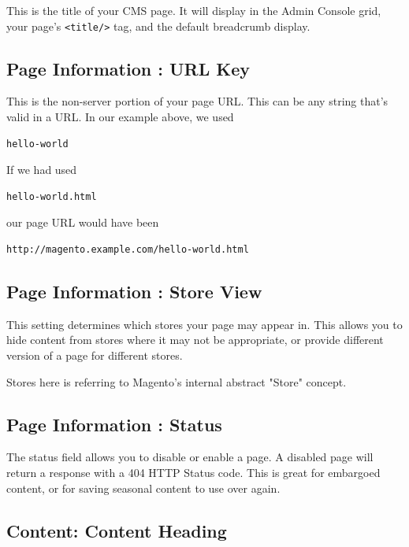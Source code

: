 \documentclass[oneside]{book}
\begin{document}
This is the title of your CMS page.  It will display in the Admin Console grid, your page's \footnotesize\texttt{\textless title/\textgreater } \normalsize  tag, and the default breadcrumb display.

\subsection{Page Information : URL Key}

This is the non-server portion of your page URL.  This can be any string that's valid in a URL.  In our example above, we used

\begin{lstlisting}
hello-world

\end{lstlisting}


If we had used

\begin{lstlisting}
hello-world.html

\end{lstlisting}


our page URL would have been

\begin{lstlisting}
http://magento.example.com/hello-world.html

\end{lstlisting}


\subsection{Page Information : Store View}

This setting determines which stores your page may appear in.  This allows you to hide content from stores where it may not be appropriate, or provide different version of a page for different stores.

Stores here is referring to Magento's internal abstract "Store" concept.

\subsection{Page Information : Status}

The status field allows you to disable or enable a page.  A disabled page will return a response with a 404 HTTP Status code.  This is great for embargoed content, or for saving seasonal content to use over again.

\subsection{Content: Content Heading}
\end{document}
